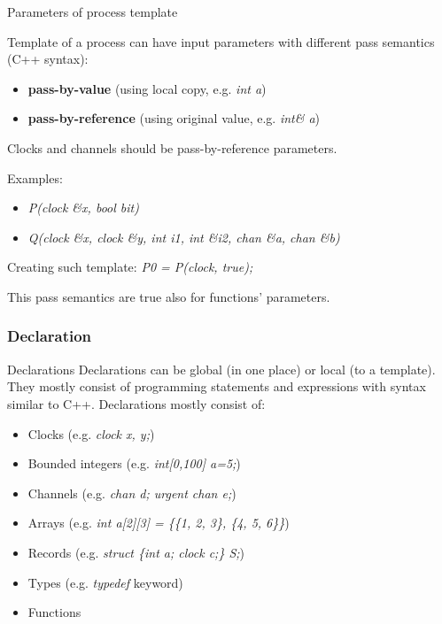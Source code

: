 \documentclass{beamer}
\begin{document}
\begin{frame}{Parameters of process template}
	
	Template of a process can have input parameters with different pass semantics (C++ syntax):
	
	\begin{itemize}
		\item \textbf{pass-by-value} (using local copy, e.g. \textit{int a})
		\item \textbf{pass-by-reference} (using original value, e.g. \textit{int\& a})
	\end{itemize}
	
	Clocks and channels should be pass-by-reference parameters.\newline
	
	Examples:
	\begin{itemize}
		\item \textit{P(clock \&x, bool bit)}
		\item \textit{Q(clock \&x, clock \&y, int i1, int \&i2, chan \&a, chan \&b)}
	\end{itemize}
	Creating such template: \textit{P0 = P(clock, true);}\newline
	
	This pass semantics are true also for functions' parameters.	
\end{frame}

\subsubsection{Declaration}

\begin{frame}{Declarations}
	Declarations can be global (in one place) or local (to a template). They mostly consist of programming statements and expressions with syntax similar to C++. Declarations mostly consist of:
	
	\begin{itemize}
		\item Clocks (e.g. \textit{clock x, y;})
		\item Bounded integers (e.g. \textit{int[0,100] a=5;})
		\item Channels (e.g. \textit{chan d; urgent chan e;})
		\item Arrays (e.g. \textit{int a[2][3] = \{\{1, 2, 3\}, \{4, 5, 6\}\}})
		\item Records (e.g. \textit{struct \{int a; clock c;\} S;})
		\item Types (e.g. \textit{typedef} keyword)
		\item Functions
	\end{itemize}
\end{frame}
\end{document}
